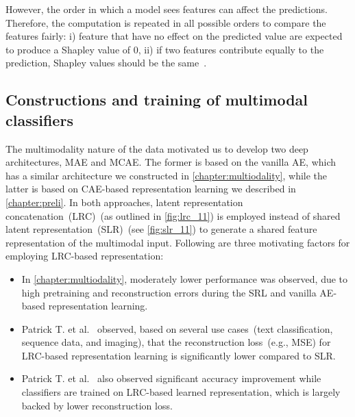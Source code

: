 \hspace*{3.5mm} However, the order in which a model sees features can affect the predictions. Therefore, the computation is repeated in all possible orders to compare the features fairly: i) feature that have no effect on the predicted value are expected to produce a Shapley value of 0, ii) if two features contribute equally to the prediction, Shapley values should be the same~\cite{NIPS2017_7062}. 


\subsection{Constructions and training of multimodal classifiers}
The multimodality nature of the data motivated us to develop two deep architectures, MAE and MCAE. The former is based on the vanilla AE, which has a similar architecture we constructed in \cref{chapter:multiodality}, while the latter is based on CAE-based representation learning we described in \cref{chapter:preli}. In both approaches, latent representation concatenation~(LRC)~(as outlined in \cref{fig:lrc_11}) is employed instead of shared latent representation~(SLR)~(see \cref{fig:slr_11}) to generate a shared feature representation of the multimodal input. Following are three motivating factors for employing LRC-based representation: 

\vspace{-2mm}
\begin{itemize}[noitemsep]
    \item In \cref{chapter:multiodality}, moderately lower performance was observed, due to high pretraining and reconstruction errors during the SRL and vanilla AE-based representation learning. 
    \item Patrick T. et al.~\cite{mmdcae} observed, based on several use cases~(text classification, sequence data, and imaging), that the reconstruction loss~(e.g., MSE) for LRC-based representation learning is significantly lower compared to SLR.
    
    \item Patrick T. et al.~\cite{mmdcae} also observed significant accuracy improvement while classifiers are trained on LRC-based learned representation, which is largely backed by lower reconstruction loss. 
\end{itemize}
\vspace{-2mm}

